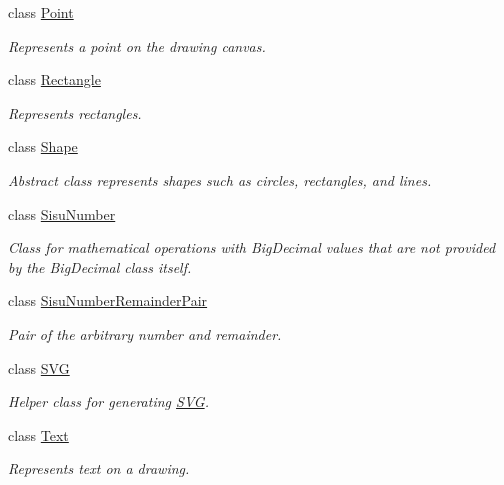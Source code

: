 \begin{DoxyCompactItemize}
class \hyperlink{classcom_1_1aarrelaakso_1_1drawl_1_1_point}{Point}
\begin{DoxyCompactList}\small\item\em Represents a point on the drawing canvas. \end{DoxyCompactList}\item 
class \hyperlink{classcom_1_1aarrelaakso_1_1drawl_1_1_rectangle}{Rectangle}
\begin{DoxyCompactList}\small\item\em Represents rectangles. \end{DoxyCompactList}\item 
class \hyperlink{classcom_1_1aarrelaakso_1_1drawl_1_1_shape}{Shape}
\begin{DoxyCompactList}\small\item\em Abstract class represents shapes such as circles, rectangles, and lines. \end{DoxyCompactList}\item 
class \hyperlink{classcom_1_1aarrelaakso_1_1drawl_1_1_sisu_number}{Sisu\+Number}
\begin{DoxyCompactList}\small\item\em Class for mathematical operations with Big\+Decimal values that are not provided by the Big\+Decimal class itself. \end{DoxyCompactList}\item 
class \hyperlink{classcom_1_1aarrelaakso_1_1drawl_1_1_sisu_number_remainder_pair}{Sisu\+Number\+Remainder\+Pair}
\begin{DoxyCompactList}\small\item\em Pair of the arbitrary number and remainder. \end{DoxyCompactList}\item 
class \hyperlink{classcom_1_1aarrelaakso_1_1drawl_1_1_s_v_g}{S\+VG}
\begin{DoxyCompactList}\small\item\em Helper class for generating \hyperlink{classcom_1_1aarrelaakso_1_1drawl_1_1_s_v_g}{S\+VG}. \end{DoxyCompactList}\item 
class \hyperlink{classcom_1_1aarrelaakso_1_1drawl_1_1_text}{Text}
\begin{DoxyCompactList}\small\item\em Represents text on a drawing. \end{DoxyCompactList}\end{DoxyCompactItemize}
